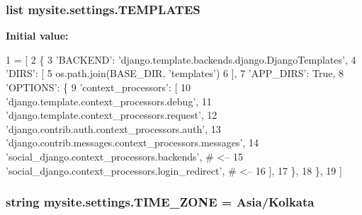 \subsubsection[{\texorpdfstring{T\+E\+M\+P\+L\+A\+T\+ES}{TEMPLATES}}]{\setlength{\rightskip}{0pt plus 5cm}list mysite.\+settings.\+T\+E\+M\+P\+L\+A\+T\+ES}\hypertarget{namespacemysite_1_1settings_a073a410822eed069da826d807a904fff}{}\label{namespacemysite_1_1settings_a073a410822eed069da826d807a904fff}
{\bfseries Initial value\+:}
\begin{DoxyCode}
1 = [
2     \{
3         \textcolor{stringliteral}{'BACKEND'}: \textcolor{stringliteral}{'django.template.backends.django.DjangoTemplates'},
4         \textcolor{stringliteral}{'DIRS'}: [
5             os.path.join(BASE\_DIR, \textcolor{stringliteral}{'templates'})
6         ],
7         \textcolor{stringliteral}{'APP\_DIRS'}: \textcolor{keyword}{True},
8         \textcolor{stringliteral}{'OPTIONS'}: \{
9             \textcolor{stringliteral}{'context\_processors'}: [
10                 \textcolor{stringliteral}{'django.template.context\_processors.debug'},
11                 \textcolor{stringliteral}{'django.template.context\_processors.request'},
12                 \textcolor{stringliteral}{'django.contrib.auth.context\_processors.auth'},
13                 \textcolor{stringliteral}{'django.contrib.messages.context\_processors.messages'},
14                 \textcolor{stringliteral}{'social\_django.context\_processors.backends'},  \textcolor{comment}{# <--}
15                 \textcolor{stringliteral}{'social\_django.context\_processors.login\_redirect'}, \textcolor{comment}{# <--}
16             ],
17         \},
18     \},
19 ]
\end{DoxyCode}
\subsubsection[{\texorpdfstring{T\+I\+M\+E\+\_\+\+Z\+O\+NE}{TIME_ZONE}}]{\setlength{\rightskip}{0pt plus 5cm}string mysite.\+settings.\+T\+I\+M\+E\+\_\+\+Z\+O\+NE = \textquotesingle{}Asia/Kolkata\textquotesingle{}}\hypertarget{namespacemysite_1_1settings_a8166ffe52ad58ff798949b613c9b5b2c}{}\label{namespacemysite_1_1settings_a8166ffe52ad58ff798949b613c9b5b2c}
